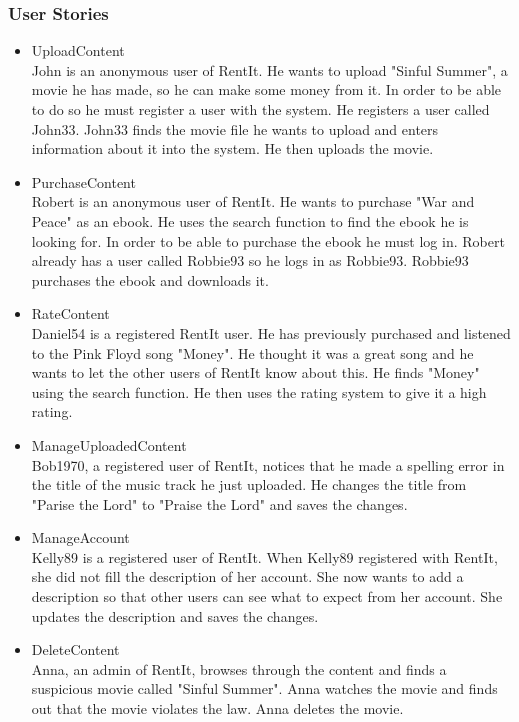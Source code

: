 \subsubsection{User Stories}
\begin{itemize}
\item UploadContent \\
John is an anonymous user of RentIt. He wants to upload "Sinful Summer", a movie he has made, so he can make some money from it. In order to be able to do so he must register a user with the system. He registers a user called John33. John33 finds the movie file he wants to upload and enters information about it into the system. He then uploads the movie.
\item PurchaseContent \\
Robert is an anonymous user of RentIt. He wants to purchase "War and Peace" as an ebook. He uses the search function to find the ebook he is looking for. In order to be able to purchase the ebook he must log in. Robert already has a user called Robbie93 so he logs in as Robbie93. Robbie93 purchases the ebook and downloads it.
\item RateContent \\
Daniel54 is a registered RentIt user. He has previously purchased and listened to the Pink Floyd song "Money". He thought it was a great song and he wants to let the other users of RentIt know about this. He finds "Money" using the search function. He then uses the rating system to give it a high rating.
\item ManageUploadedContent \\
Bob1970, a registered user of RentIt, notices that he made a spelling error in the title of the music track he just uploaded. He changes the title from "Parise the Lord" to "Praise the Lord" and saves the changes.
\item ManageAccount \\
Kelly89 is a registered user of RentIt. When Kelly89 registered with RentIt, she did not fill the description of her account. She now wants to add a description so that other users can see what to expect from her account. She updates the description and saves the changes.
\item DeleteContent \\
Anna, an admin of RentIt, browses through the content and finds a suspicious movie called "Sinful Summer". Anna watches the movie and finds out that the movie violates the law. Anna deletes the movie.
\end{itemize}

%